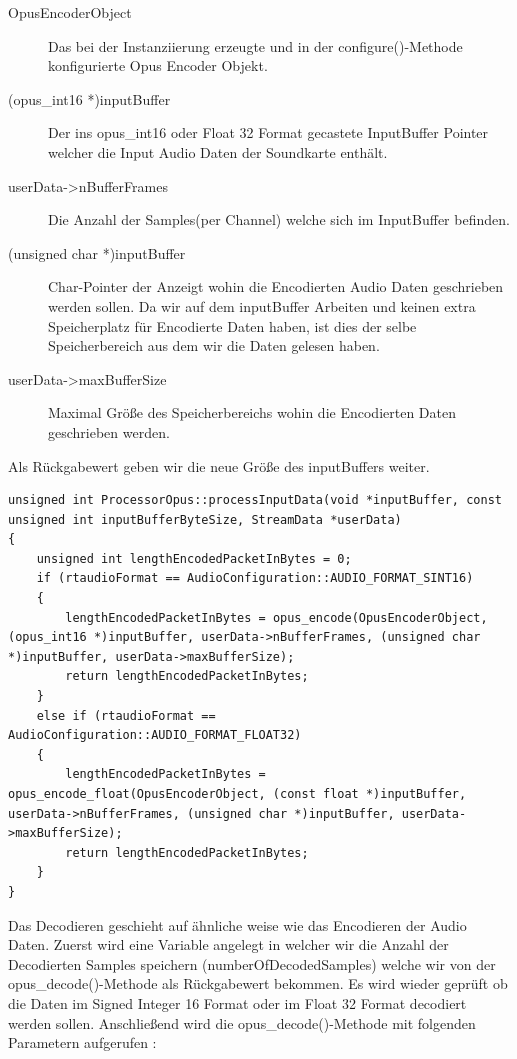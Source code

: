 \begin{description}
\item[OpusEncoderObject] Das bei der Instanziierung erzeugte und in der configure()-Methode konfigurierte Opus Encoder Objekt.
\item[(opus\_int16 *)inputBuffer] Der ins opus\_int16 oder Float 32 Format gecastete InputBuffer Pointer welcher die Input Audio Daten der Soundkarte enthält.
\item[userData->nBufferFrames] Die Anzahl der Samples(per Channel) welche sich im InputBuffer befinden.
\item[(unsigned char *)inputBuffer] Char-Pointer der Anzeigt wohin die Encodierten Audio Daten geschrieben werden sollen. Da wir auf dem inputBuffer Arbeiten und keinen extra Speicherplatz für Encodierte Daten haben, ist dies der selbe Speicherbereich aus dem wir die Daten gelesen haben.
\item[userData->maxBufferSize] Maximal Größe des Speicherbereichs wohin die Encodierten Daten geschrieben werden.
\end{description}

Als Rückgabewert geben wir die neue Größe des inputBuffers weiter. 


\begin{lstlisting}[caption={Encodieren von Audio Daten mittels Opus},label={Code:Opus}]
unsigned int ProcessorOpus::processInputData(void *inputBuffer, const unsigned int inputBufferByteSize, StreamData *userData)
{
    unsigned int lengthEncodedPacketInBytes = 0;
    if (rtaudioFormat == AudioConfiguration::AUDIO_FORMAT_SINT16)
    {
        lengthEncodedPacketInBytes = opus_encode(OpusEncoderObject, (opus_int16 *)inputBuffer, userData->nBufferFrames, (unsigned char *)inputBuffer, userData->maxBufferSize);
        return lengthEncodedPacketInBytes;
    }
    else if (rtaudioFormat == AudioConfiguration::AUDIO_FORMAT_FLOAT32)
    {
        lengthEncodedPacketInBytes = opus_encode_float(OpusEncoderObject, (const float *)inputBuffer, userData->nBufferFrames, (unsigned char *)inputBuffer, userData->maxBufferSize);
        return lengthEncodedPacketInBytes;
    }
}
\end{lstlisting}

Das Decodieren geschieht auf ähnliche weise wie das Encodieren der Audio Daten.
Zuerst wird eine Variable angelegt in welcher wir die Anzahl der Decodierten Samples speichern (numberOfDecodedSamples) welche wir von der opus\_decode()-Methode als Rückgabewert bekommen. Es wird wieder geprüft ob die Daten im Signed Integer 16 Format oder im Float 32 Format decodiert werden sollen. Anschließend wird die opus\_decode()-Methode mit folgenden Parametern aufgerufen :

